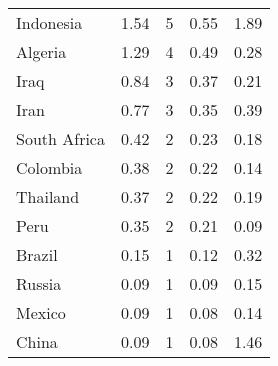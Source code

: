 \begin{longtable}[t]{lrrrr}
Indonesia & 1.54 & 5 & 0.55 & 1.89\\
Algeria & 1.29 & 4 & 0.49 & 0.28\\
Iraq & 0.84 & 3 & 0.37 & 0.21\\
Iran & 0.77 & 3 & 0.35 & 0.39\\
South Africa & 0.42 & 2 & 0.23 & 0.18\\
Colombia & 0.38 & 2 & 0.22 & 0.14\\
Thailand & 0.37 & 2 & 0.22 & 0.19\\
Peru & 0.35 & 2 & 0.21 & 0.09\\
Brazil & 0.15 & 1 & 0.12 & 0.32\\
Russia & 0.09 & 1 & 0.09 & 0.15\\
Mexico & 0.09 & 1 & 0.08 & 0.14\\
China & 0.09 & 1 & 0.08 & 1.46\\
\bottomrule
\end{longtable}